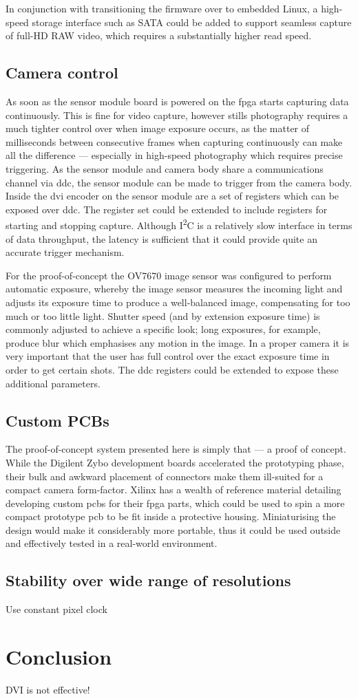 In conjunction with transitioning the firmware over to embedded Linux, a high-speed storage interface such as SATA could be added to support seamless capture of full-HD RAW video, which requires a substantially higher read speed. 

\subsection{Camera control}

As soon as the sensor module board is powered on the \gls{fpga} starts capturing data continuously. This is fine for video capture, however stills photography requires a much tighter control over when image exposure occurs, as the matter of milliseconds between consecutive frames when capturing continuously can make all the difference --- especially in high-speed photography which requires precise triggering. As the sensor module and camera body share a communications channel via \gls{ddc}, the sensor module can be made to trigger from the camera body. Inside the \gls{dvi} encoder on the sensor module are a set of registers which can be exposed over \gls{ddc}. The register set could be extended to include registers for starting and stopping capture. Although I\textsuperscript{2}C is a relatively slow interface in terms of data throughput, the latency is sufficient that it could provide quite an accurate trigger mechanism.

For the proof-of-concept the OV7670 image sensor was configured to perform automatic exposure, whereby the image sensor measures the incoming light and adjusts its exposure time to produce a well-balanced image, compensating for too much or too little light. Shutter speed (and by extension exposure time) is commonly adjusted to achieve a specific look; long exposures, for example, produce blur which emphasises any motion in the image. In a proper camera it is very important that the user has full control over the exact exposure time in order to get certain shots. The \gls{ddc} registers could be extended to expose these additional parameters.

\subsection{Custom PCBs}

The proof-of-concept system presented here is simply that --- a proof of concept. While the Digilent Zybo development boards accelerated the prototyping phase, their bulk and awkward placement of connectors make them ill-suited for a compact camera form-factor. Xilinx has a wealth of reference material detailing developing custom \glspl{pcb} for their \gls{fpga} parts, which could be used to spin a more compact prototype \gls{pcb} to be fit inside a protective housing. Miniaturising the design would make it considerably more portable, thus it could be used outside and effectively tested in a real-world environment.

\subsection{Stability over wide range of resolutions}

Use constant pixel clock

\section{Conclusion}

DVI is not effective!